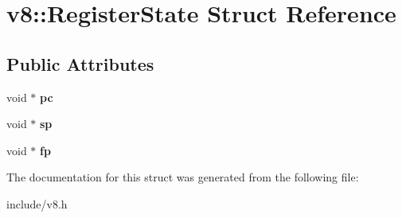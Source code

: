 \hypertarget{structv8_1_1_register_state}{}\section{v8\+:\+:Register\+State Struct Reference}
\label{structv8_1_1_register_state}
\subsection*{Public Attributes}
\begin{DoxyCompactItemize}
\item 
void $\ast$ {\bfseries pc}\hypertarget{structv8_1_1_register_state_aa0d0327871d9f95d5e64f47b7f183907}{}\label{structv8_1_1_register_state_aa0d0327871d9f95d5e64f47b7f183907}

\item 
void $\ast$ {\bfseries sp}\hypertarget{structv8_1_1_register_state_a867bb9d0b9e81c3f7256aa81dc0daee4}{}\label{structv8_1_1_register_state_a867bb9d0b9e81c3f7256aa81dc0daee4}

\item 
void $\ast$ {\bfseries fp}\hypertarget{structv8_1_1_register_state_aaeb80a1d7f6df3ae418f3e9b1295d156}{}\label{structv8_1_1_register_state_aaeb80a1d7f6df3ae418f3e9b1295d156}

\end{DoxyCompactItemize}


The documentation for this struct was generated from the following file\+:\begin{DoxyCompactItemize}
\item 
include/v8.\+h\end{DoxyCompactItemize}

